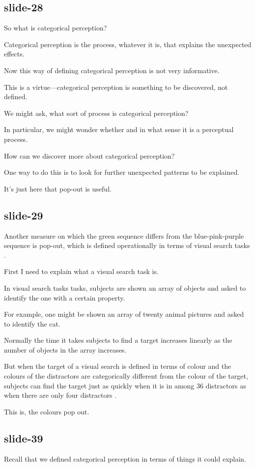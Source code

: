 \documentclass[12pt,\papersize]{extarticle}
\begin{document}
\subsection{slide-28}
So what is categorical perception?
 
Categorical perception is the process, whatever it is, that explains the unexpected effects.
 
Now this way of defining categorical perception is not very informative.
 
This is a virtue---categorical perception is something to be discovered, not defined.
 
We might ask, what sort of process is categorical perception?
 
In particular, we might wonder whether and in what sense it is a perceptual process.
 
How can we discover more about categorical perception?
 
One way to do this is to look for further unexpected patterns to be explained.
 
It's just here that pop-out is useful.
 
\subsection{slide-29}
Another measure on which the green sequence differs from the blue-pink-purple sequence is pop-out, which is defined operationally in terms of visual search tasks \citep[p.\ 117]{Treisman:1986pm}.
 
First I need to explain what a visual search task is.
 
In visual search tasks tasks, subjects are shown an array of objects and asked to identify the one with a certain property.
 
For example, one might be shown an array of twenty animal pictures and asked to identify the cat.
 
Normally the time it takes subjects to find a target increases linearly as the number of objects in the array increases.
 
But when the target of a visual search is defined in terms of colour and the colours of the distractors are categorically different from the colour of the target, subjects can find the target just as quickly when it is in among 36 distractors as when there are only four distractors \citep[Experiment 1]{Daoutis:2006qk}.
 
This is, the colours pop out.
 
\subsection{slide-39}
Recall that we defined categorical perception in terms of things it could explain.
 
\end{document}
